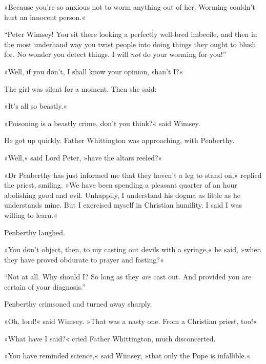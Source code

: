 »Because you're so anxious not to worm anything out of her. Worming couldn't hurt an innocent person.«

\enquote{Peter Wimsey! You sit there looking a perfectly well-bred imbecile, and then in the most underhand way you twist people into doing things they ought to blush for. No wonder you detect things. I will \textit{not} do your worming for you!}

»Well, if you don't, I shall know your opinion, shan't I?«

The girl was silent for a moment. Then she said:

»It's all so beastly.«

»Poisoning is a beastly crime, don't you think?« said Wimsey.

He got up quickly. Father Whittington was approaching, with Penberthy.

»Well,« said Lord Peter, »have the altars reeled?«

»Dr Penberthy has just informed me that they haven't a leg to stand on,« replied the priest, smiling. »We have been spending a pleasant quarter of an hour abolishing good and evil. Unhappily, I understand his dogma as little as he understands mine. But I exercised myself in Christian humility. I said I was willing to learn.«

Penberthy laughed.

»You don't object, then, to my casting out devils with a syringe,« he said, »when they have proved obdurate to prayer and fasting?«

\enquote{Not at all. Why should I? So long as they \textit{are} cast out. And provided you are certain of your diagnosis.}

Penberthy crimsoned and turned away sharply.

»Oh, lord!« said Wimsey. »That was a nasty one. From a Christian priest, too!«

»What have I said?« cried Father Whittington, much disconcerted.

»You have reminded science,« said Wimsey, »that only the Pope is infallible.«